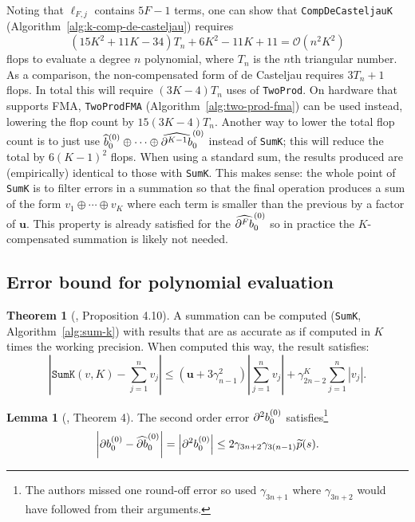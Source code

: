 \documentclass[3p, authoryear, square]{elsarticle}
\theoremstyle{definition}
\newtheorem{theorem}{Theorem}[section]
\newtheorem{lemma}{Lemma}[section]
\newcommand{\bigO}[1]{\mathcal{O}\left(#1\right)}
\newcommand{\mach}{\mathbf{u}}
\newcommand{\db}[1]{
  \ifthenelse{\equal{#1}{1}}
             {\partial b}
             {\partial^{#1} b}
}
\newcommand{\cdb}[1]{
  \ifthenelse{\equal{#1}{1}}
             {\widehat{\partial b}}
             {\widehat{\partial^{#1} b}}
}
\begin{document}
\noindent Noting that \(\ell_{F, j}\) contains \(5F - 1\) terms, one can
show that \texttt{CompDeCasteljauK} (Algorithm~\ref{alg:k-comp-de-casteljau})
requires
\begin{equation}
(15K^2 + 11K - 34)T_n + 6K^2 - 11K + 11 =
\bigO{n^2 K^2}
\end{equation}
flops to evaluate a degree \(n\) polynomial, where \(T_n\) is the
\(n\)th triangular number. As a comparison, the non-compensated form of
de Casteljau requires \(3 T_n + 1\) flops. In total this will require
\((3K - 4)T_n\) uses of \texttt{TwoProd}. On hardware that supports
FMA, \texttt{TwoProdFMA} (Algorithm~\ref{alg:two-prod-fma}) can be used
instead, lowering the flop count by \(15(3K - 4)T_n\). Another way
to lower the total flop count is to just use
\(\widehat{b}_0^{(0)} \oplus \cdots \oplus \cdb{K - 1}_0^{(0)}\)
instead of \texttt{SumK}; this will reduce the total by
\(6(K - 1)^2\) flops. When using a standard sum, the results produced
are (empirically) identical to those with \texttt{SumK}. This makes
sense: the whole point of \texttt{SumK}
is to filter errors in a summation so that the final operation produces
a sum of the form \(v_1 \oplus \cdots \oplus v_K\) where each
term is smaller than the previous by a factor of \(\mach\). This
property is already satisfied for the \(\cdb{F}_0^{(0)}\) so in
practice the \(K\)-compensated summation is likely not needed.

\subsection{Error bound for polynomial evaluation}

\begin{theorem}[\cite{Ogita2005}, Proposition 4.10]\label{thm:sum-k}
A summation can be computed (\texttt{SumK}, Algorithm~\ref{alg:sum-k})
with results that are as accurate as if computed in \(K\) times the
working precision. When computed this way, the result satisfies:
\begin{equation}
\left|\mathtt{SumK}(v, K) - \sum_{j = 1}^n v_j\right| \leq
\left(\mach + 3 \gamma_{n - 1}^2\right) \left|\sum_{j = 1}^n v_j\right| +
\gamma_{2n - 2}^K \sum_{j = 1}^n \left|v_j\right|.
\end{equation}
\end{theorem}

\begin{lemma}[\cite{Jiang2010}, Theorem 4]\label{lemma:db-lemma}
The second order error \(\db{2}^{(0)}_0\) satisfies\footnote{The authors
  missed one round-off error so used \(\gamma_{3n + 1}\) where
  \(\gamma_{3n + 2}\) would have followed from their arguments.}
\begin{equation}
  \left|\db{1}^{(0)}_0 - \cdb{1}^{(0)}_0\right| =
  \left|\db{2}^{(0)}_0\right| \leq 2 \gamma_{3n + 2} \gamma_{3(n - 1)}
  \widetilde{p}(s).
\end{equation}
\end{lemma}
\end{document}
